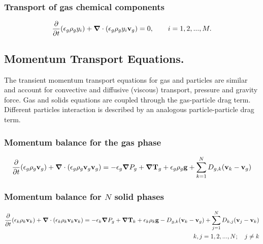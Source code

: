 \subsubsection{\hspace{1cm}Transport of gas chemical components}

\begin{equation}
\frac{\partial}{\partial t}(\epsilon_{g}\rho_{g}y_{i})+
\mbox{\boldmath $\nabla$}\cdot (\epsilon_{g}\rho_{g}y_{i}{\bf v}_{g})=0,
\qquad i=1,2,...,M.
\label{eq:gc_mass}
\end{equation}

\subsection{Momentum Transport Equations.}
The transient momentum transport equations for gas and particles are
similar and account for convective and 
diffusive (viscous) transport, pressure and gravity force. Gas and solids
equations are coupled through the gas-particle drag term. Different particles
interaction is described by an analogous particle-particle drag term.

\subsubsection{\hspace{1cm}Momentum balance for the gas phase}

\begin{equation}
\frac{\partial}{\partial t}(\epsilon_{g}\rho_{g}{\bf v}_{g})+
\mbox{\boldmath $\nabla$}\cdot (\epsilon_{g}\rho_{g}{\bf v}_{g}{\bf v}_{g})=
-\epsilon_{g}\mbox{\boldmath $\nabla$}P_{g}+
\mbox{\boldmath $\nabla$}{\bf T}_{g}
+\epsilon_{g}\rho_{g}{\bf g}+\sum_{k=1}^{N} D_{g,k}({\bf v}_{k}-{\bf v}_{g})
\label{eq:gas_mom}
\end{equation}


\subsubsection{\hspace{1cm}Momentum balance for $N$ solid phases}

\begin{eqnarray}
\htmlimage{}
\frac{\partial}{\partial t}(\epsilon_{k}\rho_{k}{\bf v}_{k})+
\mbox{\boldmath $\nabla$}\cdot (\epsilon_{k}\rho_{k}{\bf v}_{k}{\bf v}_{k}) =
-\epsilon_{k}\mbox{\boldmath $\nabla$}P_{g}+
\mbox{\boldmath $\nabla$}{\bf T}_{k}
+\epsilon_{k}\rho_{k}{\bf g} -
D_{g,k}({\bf v}_{k}-{\bf v}_{g}) + 
\sum_{j=1}^{N} D_{k,j}({\bf v}_{j} - {\bf v}_{k}) \\
\label{eq:solid_mom}
k,j=1,2,...,N; \quad j \neq k
\nonumber
\end{eqnarray}

